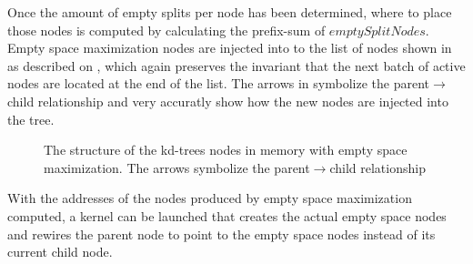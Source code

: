 Once the amount of empty splits per node has been determined, where to place
those nodes is computed by calculating the prefix-sum of
$emptySplitNodes$. Empty space maximization nodes are injected into to the list
of nodes shown in  as described on
, which again preserves the invariant that the
next batch of active nodes are located at the end of the list. The arrows in
 symbolize the parent$\rightarrow$child
relationship and very accuratly show how the new nodes are injected into the
tree.

\begin{figure}
  \centering
  \caption[The structure of the kd-trees nodes in memory with empty space
    maximization.]{The structure of the kd-trees nodes in memory with empty
    space maximization. The arrows symbolize the parent$\rightarrow$child
    relationship}
  \label{fig:emptyNodeStructure}
\end{figure}



With the addresses of the nodes produced by empty space maximization computed, a
kernel can be launched that creates the actual empty space nodes and rewires the
parent node to point to the empty space nodes instead of its current child node.


